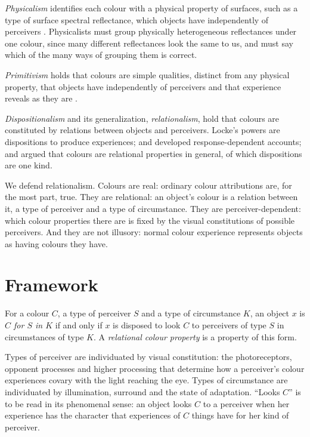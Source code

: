 \documentclass{situationist-preprint}
\begin{document}
\emph{Physicalism} identifies each colour with a physical property of surfaces, such as a type of surface spectral reflectance, which objects have independently of perceivers \citep{ByrneHilbert2003}. Physicalists must group physically heterogeneous reflectances under one colour, since many different reflectances look the same to us, and must say which of the many ways of grouping them is correct.

\emph{Primitivism} holds that colours are simple qualities, distinct from any physical property, that objects have independently of perceivers and that experience reveals as they are \citep{Campbell1993}.

\emph{Dispositionalism} and its generalization, \emph{relationalism}, hold that colours are constituted by relations between objects and perceivers. Locke's powers are dispositions to produce experiences; \citet{McGinn1983} and \citet{Johnston1992} developed response-dependent accounts; and \citet{Cohen2009} argued that colours are relational properties in general, of which dispositions are one kind.

We defend relationalism. Colours are real: ordinary colour attributions are, for the most part, true. They are relational: an object's colour is a relation between it, a type of perceiver and a type of circumstance. They are perceiver-dependent: which colour properties there are is fixed by the visual constitutions of possible perceivers. And they are not illusory: normal colour experience represents objects as having colours they have.

\section{Framework}

\begin{definition}\label{d:relcol}
For a colour $C$, a type of perceiver $S$ and a type of circumstance $K$, an object $x$ is \emph{$C$ for $S$ in $K$} if and only if $x$ is disposed to look $C$ to perceivers of type $S$ in circumstances of type $K$. A \emph{relational colour property} is a property of this form.
\end{definition}

Types of perceiver are individuated by visual constitution: the photoreceptors, opponent processes and higher processing that determine how a perceiver's colour experiences covary with the light reaching the eye. Types of circumstance are individuated by illumination, surround and the state of adaptation. \enquote{Looks $C$} is to be read in its phenomenal sense: an object looks $C$ to a perceiver when her experience has the character that experiences of $C$ things have for her kind of perceiver.
\end{document}
